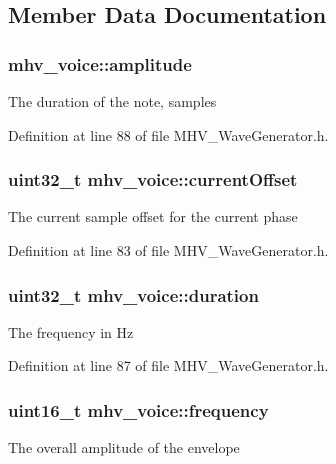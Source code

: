 \subsection{\-Member \-Data \-Documentation}
\hypertarget{structmhv__voice_a23c0a77a91913bf94930bb9f0e9fc28b}{
\subsubsection[{amplitude}]{ {\bf mhv\-\_\-voice\-::amplitude}}}
\label{structmhv__voice_a23c0a77a91913bf94930bb9f0e9fc28b}
\-The duration of the note, samples 

\-Definition at line 88 of file \-M\-H\-V\-\_\-\-Wave\-Generator.\-h.

\hypertarget{structmhv__voice_a338eb6b52bea8bcedc46dab7e854d138}{
\subsubsection[{current\-Offset}]{\setlength{\rightskip}{0pt plus 5cm}uint32\-\_\-t {\bf mhv\-\_\-voice\-::current\-Offset}}}
\label{structmhv__voice_a338eb6b52bea8bcedc46dab7e854d138}
\-The current sample offset for the current phase 

\-Definition at line 83 of file \-M\-H\-V\-\_\-\-Wave\-Generator.\-h.

\hypertarget{structmhv__voice_a1e3b7b6c0a725010eb983f606e93079d}{
\subsubsection[{duration}]{\setlength{\rightskip}{0pt plus 5cm}uint32\-\_\-t {\bf mhv\-\_\-voice\-::duration}}}
\label{structmhv__voice_a1e3b7b6c0a725010eb983f606e93079d}
\-The frequency in \-Hz 

\-Definition at line 87 of file \-M\-H\-V\-\_\-\-Wave\-Generator.\-h.

\hypertarget{structmhv__voice_a4b98f1d1e32ae313d6f30b9f6a32d2fd}{
\subsubsection[{frequency}]{\setlength{\rightskip}{0pt plus 5cm}uint16\-\_\-t {\bf mhv\-\_\-voice\-::frequency}}}
\label{structmhv__voice_a4b98f1d1e32ae313d6f30b9f6a32d2fd}
\-The overall amplitude of the envelope 

